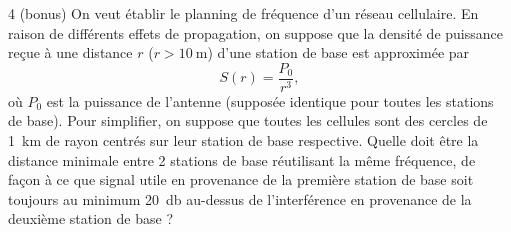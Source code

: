 \documentclass [a4paper, 11pt] {article}
\begin{document}
\begin{reponse}
\begin{enumerate}
\begin{center}
            \end{center}
        \end{enumerate}
    \end{reponse}
    
    \begin{exercice}{4 (bonus)}
        On veut établir le planning de fréquence d’un réseau cellulaire. En raison de différents effets de propagation, on suppose que la densité de puissance reçue à une distance $r$ ($r >\SI{10}{\meter}$) d’une station de base est approximée par
        \begin{equation}
            S(r) = \frac{P_0}{r^3},
        \end{equation}
        où $P_0$ est la puissance de l’antenne (supposée identique pour toutes les stations de base). Pour simplifier, on suppose que toutes les cellules sont des cercles de \SI{1}{\kilo\meter} de rayon centrés sur leur station de base respective. Quelle doit être la distance minimale entre 2 stations de base réutilisant la même fréquence, de façon à ce que signal utile en provenance de la première station de base soit toujours au minimum \SI{20}{\decibel} au-dessus de l’interférence en provenance de la deuxième station de base ?
    \end{exercice}
    
\end{document}
